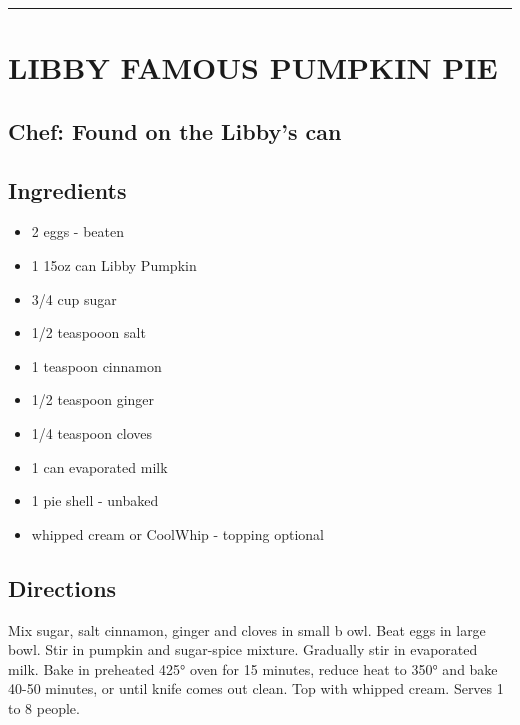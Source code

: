 \documentclass[
]{book}
\providecommand{\tightlist}{%
  \setlength{\itemsep}{0pt}\setlength{\parskip}{0pt}}
\begin{document}
\begin{center}\rule{0.5\linewidth}{0.5pt}\end{center}

\hypertarget{libby-famous-pumpkin-pie}{%
\section*{LIBBY FAMOUS PUMPKIN PIE}\label{libby-famous-pumpkin-pie}}


\hypertarget{chef-found-on-the-libbys-can}{%
\subsection*{Chef: Found on the Libby's can}\label{chef-found-on-the-libbys-can}}


\hypertarget{ingredients-89}{%
\subsection*{Ingredients}\label{ingredients-89}}


\begin{itemize}
\tightlist
\item
  2 eggs - beaten
\item
  1 15oz can Libby Pumpkin
\item
  3/4 cup sugar
\item
  1/2 teaspooon salt
\item
  1 teaspoon cinnamon
\item
  1/2 teaspoon ginger
\item
  1/4 teaspoon cloves
\item
  1 can evaporated milk
\item
  1 pie shell - unbaked
\item
  whipped cream or CoolWhip - topping optional
\end{itemize}

\hypertarget{directions-89}{%
\subsection*{Directions}\label{directions-89}}


Mix sugar, salt cinnamon, ginger and cloves in small b owl. Beat eggs in large bowl. Stir in pumpkin and sugar-spice mixture. Gradually stir in evaporated milk. Bake in preheated 425° oven for 15 minutes, reduce heat to 350° and bake 40-50 minutes, or until knife comes out clean. Top with whipped cream. Serves 1 to 8 people.
\end{document}

